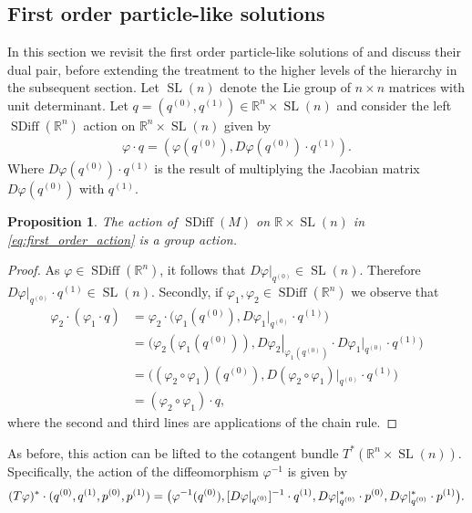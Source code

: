 \documentclass[12pt]{amsart}
\newcommand{\R}{\ensuremath{\mathbb{R}}}
\newtheorem{prop}[thm]{Proposition}
\DeclareMathOperator{\SDiff}{SDiff}
\DeclareMathOperator{\SL}{SL}
\begin{document}
\subsection{First order particle-like solutions}
\label{sec:first_order}
In this section we revisit the first order particle-like solutions of \cite{CotterHolmJacobsMeier2014} and discuss their dual pair, before extending the treatment to the higher levels of the hierarchy in the subsequent section. 
  Let $\SL(n)$ denote the Lie group of $n\times n$ matrices
  with unit determinant.
  Let $q = (q^{(0)}, q^{(1)}) \in \R^n \times \SL(n)$ and consider the left
  $\SDiff(\R^n)$ action on $\R^n \times \SL(n)$ given by
  \begin{align}
    \varphi \cdot q = (\varphi(q^{(0)} ) , D\varphi(q^{(0)} ) \cdot q^{(1)} ). \label{eq:first_order_action}
  \end{align}
  Where $D\varphi(q^{(0)} ) \cdot q^{(1)}$ is the result of multiplying
  the Jacobian matrix $D\varphi(q^{(0)} )$ with $q^{(1)}$.
  \begin{prop}
    The action of $\SDiff(M)$ on $\R \times \SL(n)$ in \eqref{eq:first_order_action} is a group action.
  \end{prop}
  \begin{proof}
    As $\varphi \in \SDiff(\R^n)$, it follows that $D\varphi |_{q^{(0)}} \in \SL(n)$.
    Therefore $D\varphi |_{q^{(0)}} \cdot q^{(1)} \in \SL(n)$.
    Secondly, if $\varphi_1,\varphi_2 \in \SDiff(\R^n)$ we observe that
    \begin{align*}
      \varphi_2 \cdot (\varphi_1 \cdot q)
      &= \varphi_2 \cdot \big(\varphi_1(q^{(0)} ) , D\varphi_1 |_{q^{(0)}} \cdot q^{(1)} \big) \\
      &= \big(\varphi_2(\varphi_1(q^{(0)} )) , \left. D\varphi_2 \right|_{\varphi_1( q^{(0)} )} \cdot D\varphi_1 |_{ q^{(0)} } \cdot q^{(1)} \big) \\
      &= \big( (\varphi_2 \circ \varphi_1)(q^{(0)} ) , D( \varphi_2 \circ \varphi_1)|_{q^{(0)} } \cdot q^{(1)} \big) \\
      &= (\varphi_2 \circ \varphi_1) \cdot q,
    \end{align*}
    where the second and third lines are applications of the chain rule.
  \end{proof}
  As before, this action can be lifted to the cotangent bundle $T^*(\R^n \times \SL(n))$.  Specifically, 
  the action of the diffeomorphism $\varphi^{-1}$ is given by
  \begin{equation}\label{eq:SDiff_cotangent_action_Q1}
    (T\varphi)^* \cdot ( q^{(0)} , q^{(1)}  , p^{(0)} , p^{(1)} ) \\
    = \big( \varphi^{-1}(q^{(0)})  , [D\varphi|_{q^{(0)}}]^{-1} \cdot q^{(1)} , D\varphi|_{q^{(0)}}^* \cdot p^{(0)} , D\varphi|_{q^{(0)}}^* \cdot p^{(1)} \big).
  \end{equation}
\end{document}
